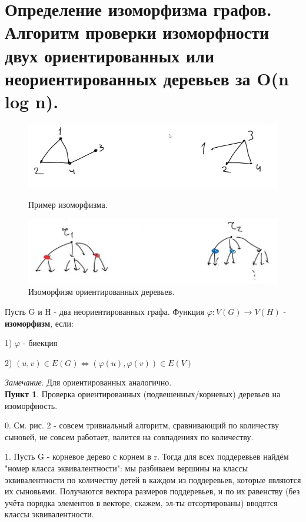 \setcounter{section}{94}
\section{Определение изоморфизма графов. Алгоритм проверки изоморфности двух ориентированных или неориентированных деревьев за O(n log n).}

\begin{figure}[!htb]
   \begin{minipage}{.5\textwidth}
     \centering
     \includegraphics[height = 1.5 cm]{images/95_isomorphism}
     \caption{Пример изоморфизма.}
   \end{minipage}\hfill
    \begin{minipage}{.5\textwidth}
     \centering
     \includegraphics[height = 1.5 cm]{images/95_isomorph2}
     \caption{Изоморфизм ориентированных деревьев.}
   \end{minipage}
\end{figure}

Пусть G и H - два неориентированных графа. Функция $\varphi: V(G) \rightarrow V(H)$ - \textbf{изоморфизм}, если:

1) $\varphi$ - биекция

2) $(u, v) \in E(G) \Leftrightarrow (\varphi(u), \varphi(v)) \in E(V)$

\textit{Замечание}. Для ориентированных аналогично. \\

\textbf{Пункт 1}. Проверка ориентированных (подвешенных/корневых) деревьев на изоморфность. 

0. См. рис. 2 - совсем тривиальный алгоритм, сравнивающий по количеству сыновей, не совсем работает, валится на совпадениях по количеству. 

1. Пусть G - корневое дерево с корнем в r. Тогда для всех поддеревьев найдём "номер класса эквивалентности": мы разбиваем вершины на классы эквивалентности по количеству детей в каждом из поддеревьев, которые являются их сыновьями. Получаются вектора размеров поддеревьев, и по их равенству (без учёта порядка элементов в векторе, скажем, эл-ты отсортированы) вводятся классы эквивалентности.


